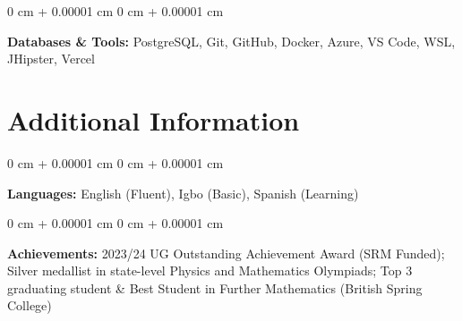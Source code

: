 \documentclass[10pt, a4paper]{article}
\newenvironment{onecolentry}{
    \begin{adjustwidth}{
        0 cm + 0.00001 cm
    }{
        0 cm + 0.00001 cm
    }
}{
    \end{adjustwidth}
} %
\begin{document}
    \vspace{0.2 cm}

    \begin{onecolentry}
        \textbf{Databases \& Tools:} PostgreSQL, Git, GitHub, Docker, Azure, VS Code, WSL, JHipster, Vercel
    \end{onecolentry}

    \vspace{0.2 cm}

    \section{Additional Information}

    \begin{onecolentry}
        \textbf{Languages:} English (Fluent), Igbo (Basic), Spanish (Learning)
    \end{onecolentry}

    \vspace{0.1 cm}



    \begin{onecolentry}
        \textbf{Achievements:} 2023/24 UG Outstanding Achievement Award (SRM Funded); Silver medallist in state-level Physics and Mathematics Olympiads; Top 3 graduating student \& Best Student in Further Mathematics (British Spring College)
    \end{onecolentry}

    \vspace{0.2 cm}
\end{document}
